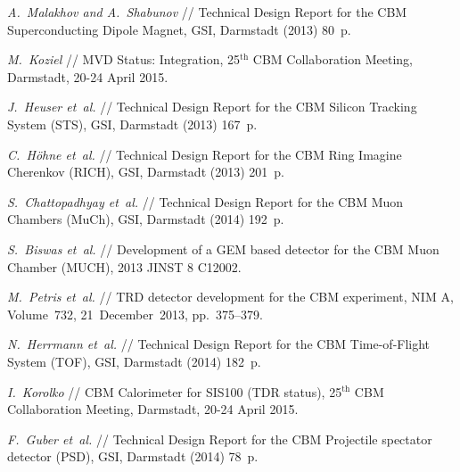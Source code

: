 \begin{thebibliography}{99}

\textit{A.~Malakhov and A.~Shabunov} // %
Technical Design Report for the CBM Superconducting Dipole Magnet,
GSI, Darmstadt (2013) 80~p.

\textit{M.~Koziel} //
MVD Status: Integration,
25$^\mathrm{th}$ CBM Collaboration Meeting, Darmstadt, 20-24 April 2015.

\textit{J.~Heuser et~al.} //
Technical Design Report for the CBM Silicon Tracking System (STS),
 GSI, Darmstadt (2013) 167~p.

\textit{C.~H\"{o}hne et~al.} //
Technical Design Report for the CBM Ring Imagine Cherenkov (RICH),
GSI, Darmstadt (2013) 201~p.

\textit{S.~Chattopadhyay et~al.} //
Technical Design Report for the CBM Muon Chambers (MuCh),
GSI, Darmstadt (2014) 192~p.

\textit{S.~Biswas et~al.} //
Development of a GEM based detector for the CBM Muon Chamber (MUCH),
2013 JINST 8 C12002.

\textit{M.~Petris et~al.} //
TRD detector development for the CBM experiment,
NIM A, Volume~732, 21~December~2013, pp.~375--379.

\textit{N.~Herrmann et~al.} //
Technical Design Report for the CBM Time-of-Flight System (TOF),
GSI, Darmstadt (2014) 182~p.

\textit{I.~Korolko} //
CBM Calorimeter for SIS100 (TDR status),
25$^\mathrm{th}$ CBM Collaboration Meeting, Darmstadt, 20-24 April 2015.\\

\textit{F.~Guber et~al.} //
Technical Design Report for the CBM Projectile spectator detector (PSD),
GSI, Darmstadt (2014) 78~p.

 \\



\end{thebibliography}
